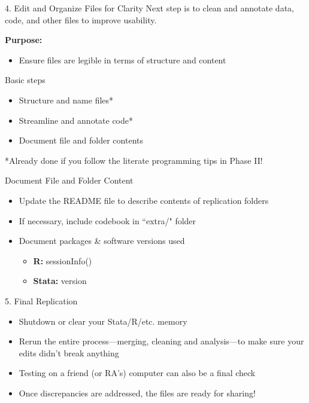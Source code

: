 \documentclass[12pt, compress, handout]{beamer}
\renewcommand{\texttt}[2][ceruleanblue]{\textcolor{#1}{\ttfamily #2}}
\let\noteitem\item %
\renewcommand{\item}{ 
	\noteitem\vspace{\fill}
	}
\newcommand{\nb}[1]{{\color{burntorange} {#1}}}
\begin{document}
 	\begin{frame}{4. Edit and Organize Files for Clarity}
 		Next step is to clean and annotate data, code, and other files to improve usability. 
	 	\bigskip
	 	
	 	\pause
	 	\textbf{Purpose:}
	 		\begin{itemize}
	 			\item Ensure files are \textcolor{burntorange}{legible} in terms of structure and content
	 		\end{itemize}
 	\end{frame}
  
 	\begin{frame}{Basic steps}
 		\begin{itemize}
 			\item Structure and name files*
 			\item Streamline and annotate code*
 			\item Document file and folder contents
 		\end{itemize}
 		
 		\pause
 		\bigskip
 		\nb{*Already done if you follow the literate programming tips in Phase II!}
 	\end{frame}
 
	\begin{frame}{Document File and Folder Content}
		\begin{itemize}
			\item Update the README file to describe contents of replication folders
			\item If necessary, include codebook in ``\texttt{extra/}" folder
			\item Document packages \& software versions used
			\begin{itemize}
				\item \textbf{R:} \texttt{sessionInfo()}
				\item \textbf{Stata:} \texttt{version}
			\end{itemize}
		\end{itemize}
	\end{frame}
	
	\begin{frame}{5. Final Replication}
				
			\begin{itemize}
				\item Shutdown or clear your Stata/R/etc. memory
				\item Rerun the entire process---merging, cleaning and analysis---to make sure your edits didn't break anything
				\item Testing on a friend (or RA's) computer can also be a final check
				\item Once discrepancies are addressed, the files are ready for sharing!
			\end{itemize}
		
	\end{frame}
\end{document}
